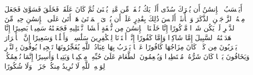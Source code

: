 \stopbuffer
\startbuffer[\q:75:36]
أَیَحۡسَبُ ٱلۡإِنسَٰنُ أَن یُتۡرَكَ سُدًى%
\stopbuffer
\startbuffer[\q:75:37]
أَلَمۡ یَكُ نُطۡفَةࣰ مِّن مَّنِیࣲّ یُمۡنَىٰ%
\stopbuffer
\startbuffer[\q:75:38]
ثُمَّ كَانَ عَلَقَةࣰ فَخَلَقَ فَسَوَّىٰ%
\stopbuffer
\startbuffer[\q:75:39]
فَجَعَلَ مِنۡهُ ٱلزَّوۡجَیۡنِ ٱلذَّكَرَ وَٱلۡأُنثَىٰۤ%
\stopbuffer
\startbuffer[\q:75:40]
أَلَیۡسَ ذَٰلِكَ بِقَٰدِرٍ عَلَىٰۤ أَن یُحۡۦِیَ ٱلۡمَوۡتَىٰ%
\stopbuffer
\startbuffer[\q:76:1]
هَلۡ أَتَىٰ عَلَى ٱلۡإِنسَٰنِ حِینࣱ مِّنَ ٱلدَّهۡرِ لَمۡ یَكُن شَیۡءࣰا مَّذۡكُورًا%
\stopbuffer
\startbuffer[\q:76:2]
إِنَّا خَلَقۡنَا ٱلۡإِنسَٰنَ مِن نُّطۡفَةٍ أَمۡشَاجࣲ نَّبۡتَلِیهِ فَجَعَلۡنَٰهُ سَمِیعَۢا بَصِیرًا%
\stopbuffer
\startbuffer[\q:76:3]
إِنَّا هَدَیۡنَٰهُ ٱلسَّبِیلَ إِمَّا شَاكِرࣰا وَإِمَّا كَفُورًا%
\stopbuffer
\startbuffer[\q:76:4]
إِنَّاۤ أَعۡتَدۡنَا لِلۡكَٰفِرِینَ سَلَٰسِلَا۟ وَأَغۡلَٰلࣰا وَسَعِیرًا%
\stopbuffer
\startbuffer[\q:76:5]
إِنَّ ٱلۡأَبۡرَارَ یَشۡرَبُونَ مِن كَأۡسࣲ كَانَ مِزَاجُهَا كَافُورًا%
\stopbuffer
\startbuffer[\q:76:6]
عَیۡنࣰا یَشۡرَبُ بِهَا عِبَادُ ٱللَّهِ یُفَجِّرُونَهَا تَفۡجِیرࣰا%
\stopbuffer
\startbuffer[\q:76:7]
یُوفُونَ بِٱلنَّذۡرِ وَیَخَافُونَ یَوۡمࣰا كَانَ شَرُّهُۥ مُسۡتَطِیرࣰا%
\stopbuffer
\startbuffer[\q:76:8]
وَیُطۡعِمُونَ ٱلطَّعَامَ عَلَىٰ حُبِّهِۦ مِسۡكِینࣰا وَیَتِیمࣰا وَأَسِیرًا%
\stopbuffer
\startbuffer[\q:76:9]
إِنَّمَا نُطۡعِمُكُمۡ لِوَجۡهِ ٱللَّهِ لَا نُرِیدُ مِنكُمۡ جَزَاۤءࣰ وَلَا شُكُورًا%
\stopbuffer
